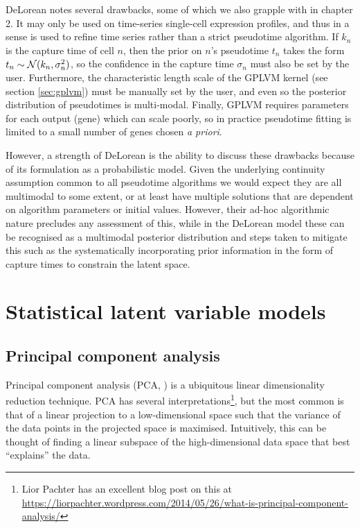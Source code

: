 DeLorean notes several drawbacks, some of which  we also grapple with in chapter 2. It may only be used on time-series single-cell expression profiles, and thus in a sense is used to refine time series rather than a strict pseudotime algorithm. If $k_n$ is the capture time of cell $n$, then the prior on $n$'s pseudotime $t_n$ takes the form $t_n \sim \mathcal{N}(k_n, \sigma_n^2)$, so the confidence in the capture time $\sigma_n$ must also be set by the user. Furthermore, the characteristic length scale of the GPLVM kernel (see section \ref{sec:gplvm}) must be manually set by the user, and even so the posterior distribution of pseudotimes is multi-modal. Finally, GPLVM requires parameters for each output (gene) which can scale poorly, so in practice pseudotime fitting is limited to a small number of genes chosen \emph{a priori}.

However, a strength of DeLorean is the ability to discuss these drawbacks because of its formulation as a probabilistic model. Given the underlying continuity assumption common to all pseudotime algorithms we would expect they are all multimodal to some extent, or at least have multiple solutions that are dependent on algorithm parameters or initial values. However, their ad-hoc algorithmic nature precludes any assessment of this, while in the DeLorean model these can be recognised as a multimodal posterior distribution and steps taken to mitigate this such as the systematically incorporating prior information in the form of capture times to constrain the latent space.




\section{Statistical latent variable models}

\subsection{Principal component analysis} \label{sec:intr:pca}

Principal component analysis (PCA, \cite{jolliffe2002principal}) is a ubiquitous linear dimensionality reduction technique. PCA has several interpretations\footnote{Lior Pachter has an excellent blog post on this at \url{https://liorpachter.wordpress.com/2014/05/26/what-is-principal-component-analysis/}}, but the most common is that of a linear projection to a low-dimensional space such that the variance of the data points in the projected space is maximised. Intuitively, this can be thought of finding a linear subspace of the high-dimensional data space that best ``explains''
the data.


